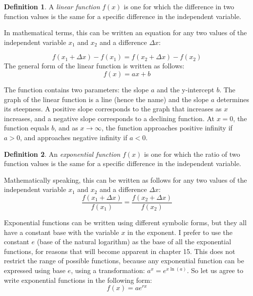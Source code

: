 \documentclass[
]{book}
\theoremstyle{definition}
\newtheorem{definition}{Definition}[chapter]
\theoremstyle{definition}
\theoremstyle{definition}
\theoremstyle{remark}
\begin{document}
\begin{definition}
\protect\hypertarget{def:def-linfunc}{}{\label{def:def-linfunc} }A \emph{linear function} \(f(x)\) is one for which the difference in two function values is the same for a specific difference in the independent variable.
\end{definition}

In mathematical terms, this can be written an equation for any two values of the independent variable \(x_1\) and \(x_2\) and a difference \(\Delta x\):

\[ f(x_1 + \Delta x) - f(x_1) = f(x_2 + \Delta x) - f(x_2) \]
The general form of the linear function is written as follows:
\begin{equation}
f(x) = ax + b
\label{eq:linear_funk}
\end{equation}

The function contains two parameters: the  slope \(a\) and the  y-intercept \(b\). The graph of the linear function is a line (hence the name) and the slope \(a\) determines its steepness. A positive slope corresponds to the graph that increases as \(x\) increases, and a negative slope corresponds to a declining function. At \(x=0\), the function equals \(b\), and as \(x \to \infty\), the function approaches positive infinity if \(a>0\), and approaches negative infinity if \(a<0\).

\begin{definition}
\protect\hypertarget{def:def-expfun}{}{\label{def:def-expfun} }An \emph{exponential function} \(f(x)\) is one for which the ratio of two function values is the same for a specific difference in the independent variable.
\end{definition}

Mathematically speaking, this can be written as follows for any two values of the independent variable \(x_1\) and \(x_2\) and a difference \(\Delta x\):
\[ \frac{f(x_1 + \Delta x)}{f(x_1)} = \frac{f(x_2 + \Delta x)}{f(x_2)}\]

Exponential functions can be written using different symbolic forms, but they all have a constant base with the variable \(x\) in the exponent. I prefer to use the constant \(e\) (base of the natural logarithm) as the base of all the exponential functions, for reasons that will become apparent in chapter 15. This does not restrict the range of possible functions, because any exponential function can be expressed using base \(e\), using a transformation: \(a^x = e^{x \ln(a)}\). So let us agree to write exponential functions in the following form:
\begin{equation}
 f(x) = a e^{rx}
\label{eq:exp_funk}
\end{equation}
\end{document}
